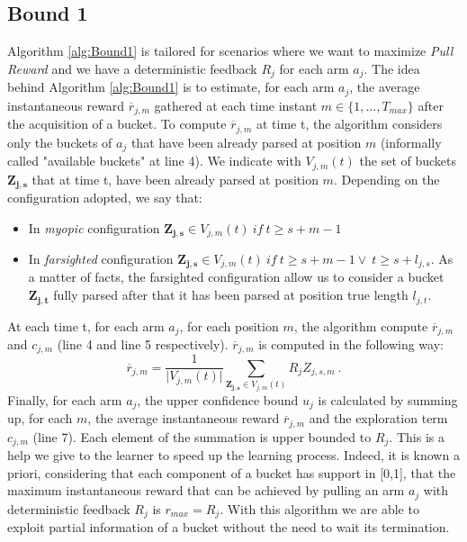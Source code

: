 \subsection{Bound 1}
Algorithm \ref{alg:Bound1} is tailored for scenarios where we want to maximize \emph{Pull Reward} and we have a deterministic feedback $R_j$ for each arm $a_j$. The idea behind Algorithm \ref{alg:Bound1} is to estimate, for each arm $a_j$, the average instantaneous reward $\overline{r}_{j,m}$ gathered at each time instant $m \in \{1, \ldots,T_{max}\}$ after the acquisition of a bucket. To compute $\overline{r}_{j,m}$ at time t, the algorithm considers only the buckets of $a_j$ that have been already parsed at position $m$ (informally called "available buckets" at line 4). We indicate with $V_{j,m}(t)$ the set of buckets $\boldsymbol{Z_{j,s}}$ that at time t, have been already parsed at position $m$. Depending on the configuration adopted, we say that:
\begin{itemize}
	\item In \emph{myopic} configuration  $\boldsymbol{Z_{j,s}} \in V_{j,m}(t) \ if \ t\geq s+m-1$
	\item In \emph{farsighted} configuration  $\boldsymbol{Z_{j,s}} \in V_{j,m}(t) \ if \ t\geq s+m-1 \vee \ t \geq s+l_{j,s} $. As a matter of facts, the farsighted configuration allow us to consider a bucket $\boldsymbol{Z_{j,t}}$ fully parsed after that it has been parsed at position true length $l_{j,t}$. 
\end{itemize}


At each time t, for each arm $a_j$, for each position $m$, the algorithm compute $\overline{r}_{j,m}$ and $c_{j,m}$ (line 4 and line 5 respectively). $\overline{r}_{j,m}$ is computed in the following way: $$\overline{r}_{j,m} = \frac{1}{\vert V_{j,m}(t) \vert} \sum_{\boldsymbol{Z_{j,s}} \in V_{j,m}(t)} R_jZ_{j,s,m}\ .$$
Finally, for each arm $a_j$, the upper confidence bound $u_j$ is calculated by summing up, for each $m$, the average instantaneous reward $\overline{r}_{j,m}$ and the exploration term  $c_{j,m}$  (line 7). Each element of the summation is upper bounded to $R_j$. This is a help we give to the learner to speed up the learning process. Indeed, it is known a priori, considering that each component of a bucket has support in [0,1], that the maximum instantaneous reward that can be achieved by pulling an arm $a_j$ with deterministic feedback $R_j$ is $r_{max} = R_j$. With this algorithm we are able to exploit partial information of a bucket without the need to wait its termination.









